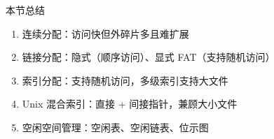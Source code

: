 \documentclass[10pt, aspectratio=169]{beamer}
\begin{document}
\begin{frame}{本节总结}
    \begin{enumerate}
        \item 连续分配：访问快但外碎片多且难扩展
        \item 链接分配：隐式（顺序访问）、显式 FAT（支持随机访问）
        \item 索引分配：支持随机访问，多级索引支持大文件
        \item Unix 混合索引：直接 + 间接指针，兼顾大小文件
        \item 空闲空间管理：空闲表、空闲链表、位示图
    \end{enumerate}
\end{frame}
\end{document}
